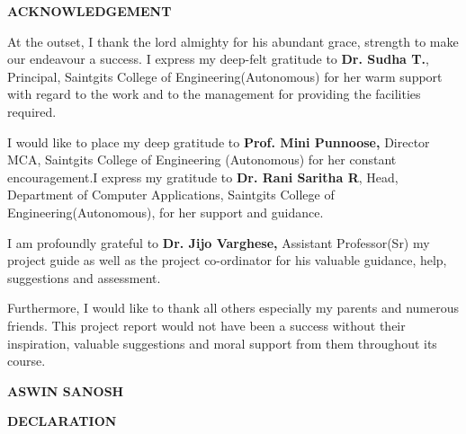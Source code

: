 \documentclass[12pt,a4paper]{report}
\begin{document}
\newpage
\thispagestyle{empty}

\begin{center}
{\fontsize{16pt}{18pt}\selectfont\textbf{ACKNOWLEDGEMENT}}

\end{center}

\vspace{1cm}

At the outset, I thank the lord almighty for his abundant grace, strength to make our endeavour a success. I express my deep-felt gratitude to \textbf{Dr. Sudha T.}, Principal, Saintgits College of Engineering(Autonomous) for her warm support with regard to the work and to the management for providing the facilities required.


I would like to place my deep gratitude to \textbf{Prof. Mini Punnoose,} Director MCA, Saintgits College of Engineering (Autonomous) for her constant encouragement.I express my gratitude to \textbf{Dr. Rani Saritha R}, Head, Department of Computer Applications, Saintgits College of Engineering(Autonomous), for her support and guidance.


I am profoundly grateful to \textbf{Dr. Jijo Varghese,} Assistant Professor(Sr) my project guide as well as the project co-ordinator for his valuable guidance, help, suggestions and assessment.


Furthermore, I would like to thank all others especially my parents and numerous friends. This project report would not have been a success without their inspiration, valuable suggestions and moral support from them throughout its course.


\vspace{2cm}

\begin{flushright}
\textbf{ASWIN SANOSH}
\end{flushright}

\newpage
\thispagestyle{empty}

\begin{center}
{\fontsize{16pt}{18pt}\selectfont\textbf{DECLARATION}}


\end{center}

\vspace{1cm}
\end{document}
